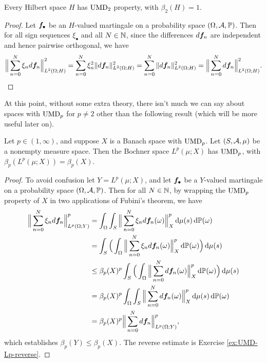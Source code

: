 \begin{prop}
  Every Hilbert space $H$ has $\mathrm{UMD}_{2}$ property, with $\beta_{2}(H) = 1$.
\end{prop}

\begin{proof}
  Let $\bm{f}_{\bullet}$ be an $H$-valued martingale on a probability space $(\Omega,\mathcal{A},\mathbb{P})$.
  Then for all sign sequences $\xi_{\bullet}$ and all $N \in \mathbb{N}$, since the differences $d\bm{f}_{n}$ are independent and hence pairwise orthogonal, we have
  \begin{equation*}
    \Big\| \sum_{n=0}^N \xi_{n} d\bm{f}_{n} \Big\|_{L^2(\Omega;H)}^{2}
    = \sum_{n = 0}^{N} \xi_{n}^{2} \|d\bm{f}_{n}\|_{L^2(\Omega;H)}^{2}
    = \sum_{n = 0}^{N} \|d\bm{f}_{n}\|_{L^2(\Omega;H)}^{2}
    = \Big\| \sum_{n=0}^N d\bm{f}_{n} \Big\|_{L^2(\Omega;H)}^{2}.
  \end{equation*}  
\end{proof}

At this point, without some extra theory, there isn't much we can say about spaces with $\mathrm{UMD}_{p}$ for $p \neq 2$ other than the following result (which will be more useful later on).

\begin{prop}
  Let $p \in (1,\infty)$, and suppose $X$ is a Banach space with $\mathrm{UMD}_{p}$.
  Let $(S,\mathcal{A},\mu)$ be a nonempty measure space.
  Then the Bochner space $L^p(\mu;X)$ has $\mathrm{UMD}_{p}$, with $\beta_{p}(L^p(\mu;X)) = \beta_{p}(X)$. 
\end{prop}

\begin{proof}
  To avoid confusion let $Y = L^p(\mu;X)$, and let $\bm{f}_{\bullet}$ be a $Y$-valued martingale on a probability space $(\Omega,\mathcal{A},\mathbb{P})$.
  Then for all $N \in \mathbb{N}$, by wrapping the $\mathrm{UMD}_{p}$ property of $X$ in two applications of Fubini's theorem, we have
  \begin{equation*}
    \begin{aligned}
      \Big\| \sum_{n=0}^N \xi_{n} d\bm{f}_{n} \Big\|_{L^p(\Omega;Y)}^{p}
      &= \int_{\Omega} \int_{S} \Big\| \sum_{n=0}^N \xi_{n} d\bm{f}_{n}(\omega) \Big\|_{X}^{p} \, \mathrm{d}\mu(s) \, \mathrm{d}\mathbb{P}(\omega) \\
      &=  \int_{S} \Big( \int_{\Omega} \Big\| \sum_{n=0}^N \xi_{n} d\bm{f}_{n}(\omega) \Big\|_{X}^{p}  \, \mathrm{d}\mathbb{P}(\omega) \Big) \, \mathrm{d}\mu(s) \\
      &\leq \beta_{p}(X)^{p} \int_{S} \Big( \int_{\Omega} \Big\| \sum_{n=0}^N d\bm{f}_{n}(\omega) \Big\|_{X}^{p}  \, \mathrm{d}\mathbb{P}(\omega) \Big) \, \mathrm{d}\mu(s) \\
      &= \beta_{p}(X)^{p} \int_{\Omega}  \int_{S} \Big\| \sum_{n=0}^N d\bm{f}_{n}(\omega) \Big\|_{X}^{p}   \, \mathrm{d}\mu(s) \, \mathrm{d}\mathbb{P}(\omega) \\
      &= \beta_{p}(X)^{p} \Big\| \sum_{n=0}^N d\bm{f}_{n} \Big\|_{L^p(\Omega;Y)}^{p},
    \end{aligned}
  \end{equation*}
  which establishes $\beta_{p}(Y) \leq \beta_{p}(X)$.
  The reverse estimate is Exercise \ref{ex:UMD-Lp-reverse}. %
\end{proof}

